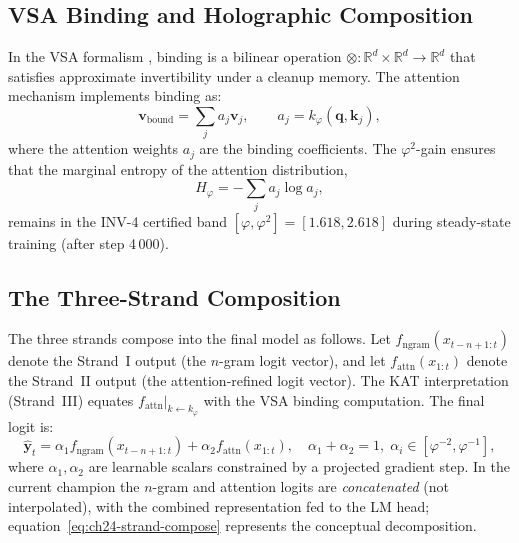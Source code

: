 \subsection{VSA Binding and Holographic Composition}
\label{subsec:ch24-vsa-binding}

In the VSA formalism \cite{kanerva_hypercomputing,plate_holographic_reduced_rep},
binding is a bilinear operation $\otimes : \mathbb{R}^d \times \mathbb{R}^d \to
\mathbb{R}^d$ that satisfies approximate invertibility under a cleanup memory.
The attention mechanism implements binding as:
\begin{equation}\label{eq:ch24-vsa-binding}
  \mathbf{v}_{\text{bound}} = \sum_j a_j \mathbf{v}_j,
  \qquad a_j = k_\varphi(\mathbf{q}, \mathbf{k}_j),
\end{equation}
where the attention weights $a_j$ are the binding coefficients.  The
$\varphi^2$-gain ensures that the marginal entropy of the attention distribution,
\begin{equation}\label{eq:ch24-entropy}
  H_\varphi = -\sum_j a_j \log a_j,
\end{equation}
remains in the INV-4 certified band $[\varphi, \varphi^2] = [1.618, 2.618]$
during steady-state training (after step 4\,000).

\subsection{The Three-Strand Composition}
\label{subsec:ch24-strand-composition}

The three strands compose into the final model as follows.  Let
$f_{\text{ngram}}(x_{t-n+1:t})$ denote the Strand~I output (the $n$-gram
logit vector), and let $f_{\text{attn}}(x_{1:t})$ denote the Strand~II output
(the attention-refined logit vector).  The KAT interpretation (Strand~III)
equates $f_{\text{attn}}|_{k \leftarrow k_\varphi}$ with the VSA binding
computation.  The final logit is:
\begin{equation}\label{eq:ch24-strand-compose}
  \hat{\mathbf{y}}_t = \alpha_1 f_{\text{ngram}}(x_{t-n+1:t})
    + \alpha_2 f_{\text{attn}}(x_{1:t}),
    \quad \alpha_1 + \alpha_2 = 1,\; \alpha_i \in [\varphi^{-2}, \varphi^{-1}],
\end{equation}
where $\alpha_1, \alpha_2$ are learnable scalars constrained by a projected
gradient step.  In the current champion the $n$-gram and attention logits are
\emph{concatenated} (not interpolated), with the combined representation fed to
the LM head; equation~\eqref{eq:ch24-strand-compose} represents the conceptual
decomposition.

